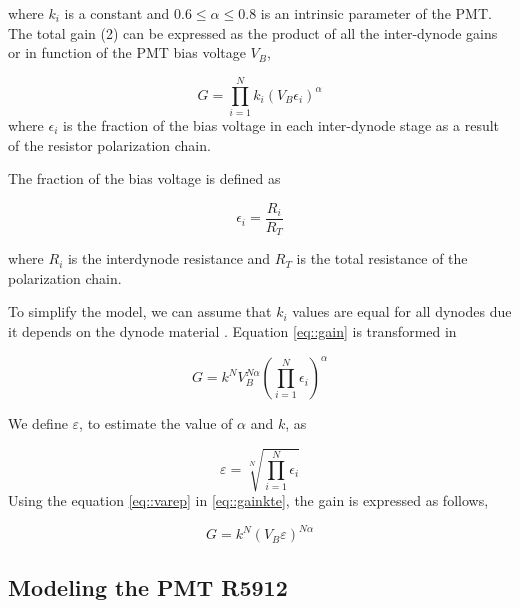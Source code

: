 \documentclass[letterpaper, 10 pt, conference]{ieeeconf}  %
\begin{document}
\noindent where $k_i$ is a constant and $ 0.6  \leq \alpha \leq 0.8$ is an intrinsic parameter of the PMT. The total gain (2) can be expressed as the product of all the inter-dynode gains or in function of the PMT bias voltage $V_B$,

\begin{equation}
G =  \prod_{i=1}^{N}  k_i (V_B \epsilon_i)^{\alpha} 
\label{eq::gain}
\end{equation}
where $\epsilon_i$ is the fraction of the bias voltage in each inter-dynode stage as a result of the resistor polarization chain.

The fraction of the bias voltage is defined as 

\begin{equation}
\epsilon_i = \frac{R_i}{R_T}
\end{equation}

where $R_i$ is the interdynode resistance and $R_T$ is the total resistance of the polarization chain.

To simplify the model, we can assume that $k_i$ values are equal for all dynodes due it depends on the dynode material \cite{Akimov2017}. Equation \ref{eq::gain} is transformed in

\begin{equation}
G =  k^N V_B^{N\alpha} \left ( \prod_{i=1}^{N} \epsilon_i \right)^{\alpha} 
\label{eq::gainkte}
\end{equation}

We define $\varepsilon$, to estimate the value of $\alpha$ and $k$, as

\begin{equation}
    \varepsilon = \sqrt[N]{\prod_{i=1}^{N} \epsilon_i}
    \label{eq::varep}
\end{equation}
Using the equation \ref{eq::varep} in \ref{eq::gainkte}, the gain is expressed as follows,

\begin{equation}
G = k^N (V_B \varepsilon)^{N\alpha}  
\label{eq::gainmodel}
\end{equation}

\subsection{Modeling the PMT R5912}
\end{document}
